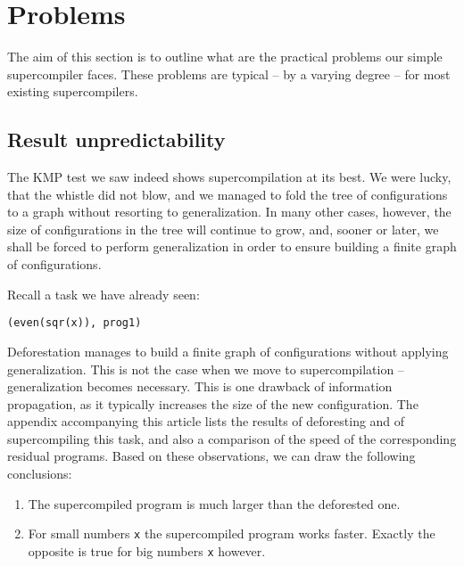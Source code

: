 \section{Problems}


The aim of this section is to outline what are the practical problems 
our simple supercompiler faces.
These problems are typical -- by a varying degree -- for most existing supercompilers.

\subsection{Result unpredictability}

The KMP test we saw indeed shows supercompilation at its best.
We were lucky, that the whistle did not blow, and we managed to fold the tree of configurations
to a graph without resorting to generalization.
In many other cases, however, the size of configurations in the tree will
continue to grow, and, sooner or later, we shall be forced to 
perform generalization in order to ensure building a finite 
graph of configurations.

Recall a task we have already seen:
\begin{lstlisting}[language=sll]
(even(sqr(x)), prog1)
\end{lstlisting}

Deforestation manages to build a finite graph of configurations  without applying generalization.
This is not the case when we move to supercompilation -- generalization becomes necessary.
This is one drawback of information propagation, as it typically
increases the size of the new configuration.
The appendix accompanying this article lists the results of deforesting and of supercompiling this task,
and also a comparison of the speed of the corresponding residual programs.
Based on these observations, we can draw the following conclusions:
\begin{enumerate}
  \item The supercompiled program is much larger than the deforested one.
  \item For small numbers \texttt{x} the supercompiled program works faster.
  Exactly the opposite is true for big numbers \texttt{x} however.
\end{enumerate}

